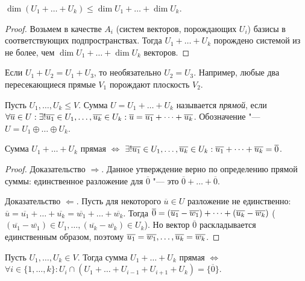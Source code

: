 \begin{corollary}
	$\dim{(U_1 + \dots + U_k)} \le \dim{U_1} + \dots + \dim{U_k}$.
\end{corollary}

\begin{proof}
	Возьмем в качестве $A_i$ (систем векторов, порождающих $U_i$) базисы в соответствующих подпространствах. Тогда $U_1 + \dots + U_k$ порождено системой из не более, чем $\dim{U_1} + \dots + \dim{U_k}$ векторов.
\end{proof}

\begin{note}
	Если $U_1 + U_2 = U_1 + U_3$, то необязательно $U_2 = U_3$. Например, любые два пересекающиеся прямые $V_1$ порождают плоскость $V_2$.
\end{note}

\begin{definition}
	Пусть $U_1, \dots, U_k \le V$. Сумма $U = U_1 + \dots + U_k$ называется \textit{прямой}, если $\forall \overline{u} \in U: \exists! \overline{u_1} \in U_1, \dots, \overline{u_k} \in U_k: \overline{u} \hm{=} \overline{u_1} + \dots + \overline{u_k}$. Обозначение "--- $U = U_1 \oplus \dots \oplus U_k$.
\end{definition}

\begin{proposition}
	Сумма $U_1 + \dots + U_k$ прямая $\Leftrightarrow$ $\exists! \overline{u_1} \in U_1, \dots, \overline{u_k} \hm{\in} U_k: \overline{u_1} + \dots + \overline{u_k} = \overline{0}$.
\end{proposition}

\begin{proof}
	Доказательство $\Rightarrow$. Данное утверждение верно по определению прямой суммы: единственное разложение для $\overline{0}$ "--- это $\overline{0} + \dots + \overline{0}$.
	
	Доказательство $\Leftarrow$. Пусть для некоторого $\overline{u} \in U$ разложение не единственно: $\overline{u} = \overline{u_1} + \dots + \overline{u_k} = \overline{w_1} + \dots + \overline{w_k}$. Тогда $\overline{0} = (\overline{u_1} - \overline{w_1}) \hm{+} \dots + (\overline{u_k} - \overline{w_k})$ ($(\overline{u_1} - \overline{w_1}) \in U_1, \dots, (\overline{u_k} - \overline{w_k}) \in U_k$). Но вектор $\overline{0}$ раскладывается единственным образом, поэтому $\overline{u_1} = \overline{w_1}, \dots, \overline{u_k} \hm{=} \overline{w_k}$.
\end{proof}

\begin{theorem}
	Пусть $U_1, \dots, U_k \in V$. Тогда сумма $U_1 + \dots + U_k$ прямая $\Leftrightarrow$ $\forall i \in \{1, \dots, k\}: U_i \cap (U_1+\dots+U_{i-1}+U_{i+1}+U_k) = \{\overline{0}\}$.
\end{theorem}

